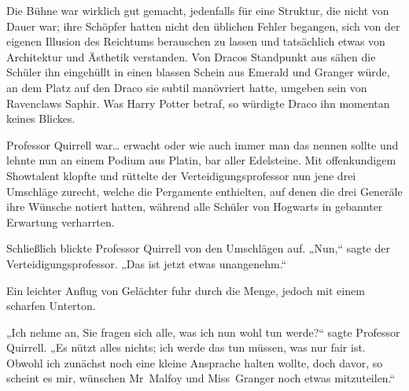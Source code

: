 Die Bühne war wirklich gut gemacht, jedenfalls für eine Struktur, die nicht von Dauer war; ihre Schöpfer hatten nicht den üblichen Fehler begangen, sich von der eigenen Illusion des Reichtums berauschen zu lassen und tatsächlich etwas von Architektur und Ästhetik verstanden. Von Dracos Standpunkt aus sähen die Schüler ihn eingehüllt in einen blassen Schein aus Emerald und Granger würde, an dem Platz auf den Draco sie subtil manövriert hatte, umgeben sein von Ravenclaws Saphir. Was Harry Potter betraf, so würdigte Draco ihn momentan keines Blickes.

Professor Quirrell war… erwacht oder wie auch immer man das nennen sollte und lehnte nun an einem Podium aus Platin, bar aller Edelsteine. Mit offenkundigem Showtalent klopfte und rüttelte der Verteidigungsprofessor nun jene drei Umschläge zurecht, welche die Pergamente enthielten, auf denen die drei Generäle ihre Wünsche notiert hatten, während alle Schüler von Hogwarts in gebannter Erwartung verharrten.

Schließlich blickte Professor Quirrell von den Umschlägen auf. „Nun,“ sagte der Verteidigungsprofessor. „Das ist jetzt etwas unangenehm.“

Ein leichter Anflug von Gelächter fuhr durch die Menge, jedoch mit einem scharfen Unterton.

„Ich nehme an, Sie fragen sich alle, was ich nun wohl tun werde?“ sagte Professor Quirrell. „Es nützt alles nichts; ich werde das tun müssen, was nur fair ist. Obwohl ich zunächst noch eine kleine Ansprache halten wollte, doch davor, so scheint es mir, wünschen Mr~Malfoy und Miss~Granger noch etwas mitzuteilen.“

